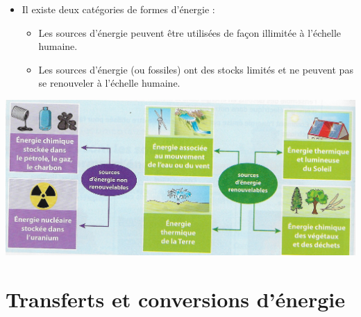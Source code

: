 \documentclass[xcolor={dvipsnames}]{beamer}
\begin{document}
\begin{frame}
	\begin{mybilan}
		\begin{itemize}
			\item Il existe deux catégories de formes d'énergie :
			\begin{itemize}
				\item Les sources d'énergie  peuvent être utilisées de façon illimitée à l'échelle humaine.
				\item Les sources d'énergie  (ou fossiles) ont des stocks limités et ne peuvent pas se renouveler à l'échelle humaine.
			\end{itemize}
		\end{itemize}
		
		
		\begin{center}
			\includegraphics[scale=0.7]{types_energie}
		\end{center}
	\end{mybilan}



\end{frame}




\section{Transferts et conversions d'énergie}
\end{document}
